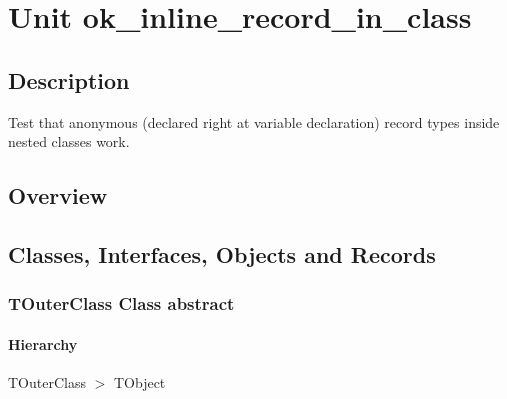 \documentclass{report}
\newif\ifpdf
\begin{document}
\label{toc}\tableofcontents
\newpage
\newlength{\tmplength}
\chapter{Unit ok{\_}inline{\_}record{\_}in{\_}class}
\label{ok_inline_record_in_class}
\section{Description}
Test that anonymous (declared right at variable declaration) record types inside nested classes work.
\section{Overview}
\begin{description}
\item[\texttt{\begin{ttfamily}TOuterClass\end{ttfamily} Class}]
\end{description}
\section{Classes, Interfaces, Objects and Records}
\ifpdf
\subsection*{\large{\textbf{TOuterClass Class abstract}}\normalsize\hspace{1ex}\hrulefill}
\else
\subsection*{TOuterClass Class abstract}
\fi
\label{ok_inline_record_in_class.TOuterClass}
\subsubsection*{\large{\textbf{Hierarchy}}\normalsize\hspace{1ex}\hfill}
TOuterClass {$>$} TObject
\end{document}
